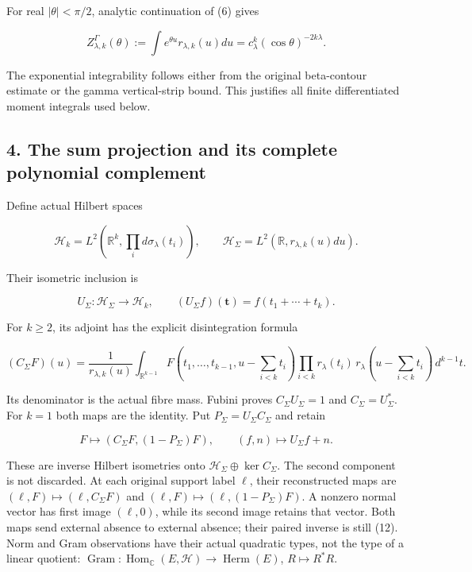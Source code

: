 For real \(|\theta|<\pi/2\), analytic continuation of (6) gives

\[
Z_{\lambda,k}^{\Gamma}(\theta)
 :=\int e^{\theta u}r_{\lambda,k}(u)du
 =c_\lambda^k(\cos\theta)^{-2k\lambda}.                            \tag{9}
\]

The exponential integrability follows either from the original beta-contour estimate or the gamma
vertical-strip bound. This justifies all finite differentiated moment integrals used below.

\subsection{4. The sum projection and its complete polynomial
complement}\label{gamma_convolution:the-sum-projection-and-its-complete-polynomial-complement}

Define actual Hilbert spaces

\[
\mathcal H_k=L^2(\mathbb R^k,\prod_i d\sigma_\lambda(t_i)),\qquad
\mathcal H_\Sigma=L^2(\mathbb R,r_{\lambda,k}(u)du).
\]

Their isometric inclusion is

\[
U_\Sigma:\mathcal H_\Sigma\to\mathcal H_k,\qquad
(U_\Sigma f)(\mathbf t)=f(t_1+\cdots+t_k).                           \tag{10}
\]

For \(k\ge2\), its adjoint has the explicit disintegration formula

\[
(C_\Sigma F)(u)=\frac{1}{r_{\lambda,k}(u)}
\int_{\mathbb R^{k-1}}
F(t_1,\ldots,t_{k-1},u-\sum_{i<k}t_i)
\prod_{i<k}r_\lambda(t_i)\,r_\lambda(u-\sum_{i<k}t_i)\,d^{k-1}t.
                                                                    \tag{11}
\]

Its denominator is the actual fibre mass. Fubini proves \(C_\Sigma U_\Sigma=1\) and
\(C_\Sigma=U_\Sigma^*\). For \(k=1\) both maps are the identity. Put \(P_\Sigma=U_\Sigma C_\Sigma\)
and retain

\[
F\longmapsto(C_\Sigma F,(1-P_\Sigma)F),\qquad
(f,n)\longmapsto U_\Sigma f+n.                                      \tag{12}
\]

These are inverse Hilbert isometries onto \(\mathcal H_\Sigma\oplus\ker C_\Sigma\). The second
component is not discarded. At each original support label \(\ell\), their reconstructed maps are
\((\ell,F)\mapsto(\ell,C_\Sigma F)\) and \((\ell,F)\mapsto(\ell,(1-P_\Sigma)F)\). A nonzero normal
vector has first image \((\ell,0)\), while its second image retains that vector. Both maps send
external absence to external absence; their paired inverse is still (12). Norm and Gram observations
have their actual quadratic types, not the type of a linear quotient:
\(\operatorname{Gram}:\operatorname{Hom}_{\mathbb C}(E,\mathcal H)
\to\operatorname{Herm}(E)\), \(R\mapsto R^*R\).

